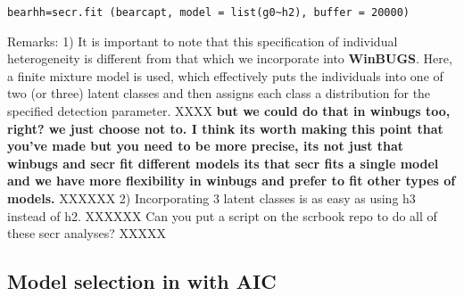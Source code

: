\begin{verbatim}
bearhh=secr.fit (bearcapt, model = list(g0~h2), buffer = 20000)
\end{verbatim}

Remarks:  1) It is important to note that this specification of
individual heterogeneity is different from that which we incorporate
into \textbf{WinBUGS}.  Here, a finite mixture model is used, which effectively
puts the individuals into one of two (or three) latent classes and
then assigns each class a distribution for the specified detection
parameter. XXXX
{\bf but we could do that in winbugs too, right? we just
choose not to. I think its worth making this point that you've made
but you need to be more precise, its not just that winbugs and secr
fit different models its that secr fits a single model and we have
more flexibility in winbugs and prefer to fit other types of models.}
XXXXXX
  2) Incorporating 3 latent classes is as easy as using h3
instead of h2.  XXXXXX Can you put a script on the scrbook repo to do
all of these secr analyses? XXXXX
\begin{comment}
XXXXX if we have exercises in the book we'll put these at the end.
 For homework, the reader should incorporate
heterogeneity in sigma and using 2 and 3 classes.   Take note of any
warning messages or errors.
\end{comment}



\subsection{Model selection in \secr with AIC}

